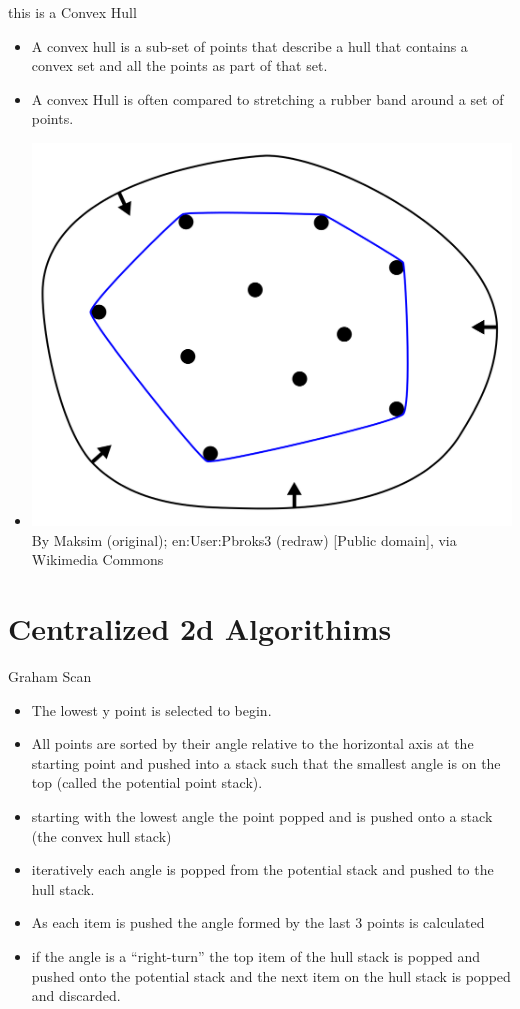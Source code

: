 \documentclass{beamer}
\begin{document}
\begin{frame}{this is a Convex Hull}
  \begin{itemize}
  \item
    A convex hull is a sub-set of points that describe a hull that contains a convex set and all the points as part of that set.
  \item
  	A convex Hull is often compared to stretching a rubber band around a set of points.
  \item
   \includegraphics[width=.6\linewidth]{imgs/convex_hull.png}
By Maksim (original); en:User:Pbroks3 (redraw) [Public domain], via Wikimedia Commons
  \end{itemize}
  
\end{frame}

\section{Centralized 2d Algorithims}

\begin{frame}{Graham Scan}
\begin{itemize}
\item
	The lowest y point is selected to begin.
\item
	All points are sorted by their angle relative to the horizontal axis at the starting point and pushed into a stack such that the smallest angle is on the top (called the potential point stack).
\item
	starting with the lowest angle the point popped and is pushed onto a stack (the convex hull stack)
\item
	iteratively each angle is popped from the potential stack and pushed to the hull stack.
\item 
	As each item is pushed the angle formed by the last 3 points is calculated
\item
	if the angle is a ``right-turn'' the top item of the hull stack is popped and pushed onto the potential stack and the next item on the hull stack is popped and discarded.
\end{itemize}

\end{frame}
\end{document}
